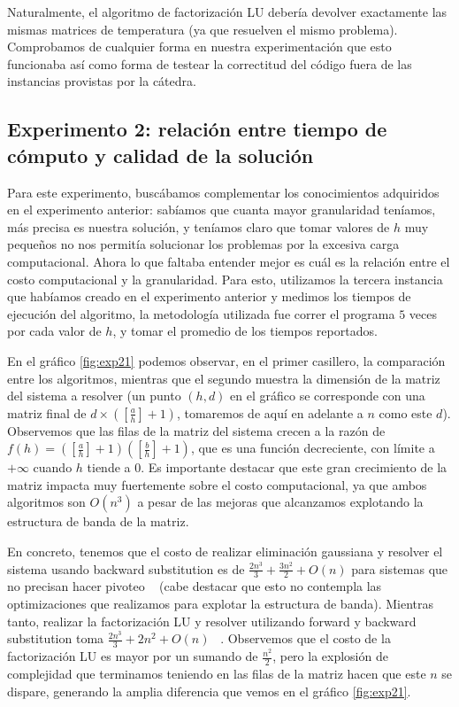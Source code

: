 Naturalmente, el algoritmo de factorización LU debería devolver exactamente las mismas matrices de temperatura (ya que resuelven el mismo problema). Comprobamos de cualquier forma en nuestra experimentación que esto funcionaba así como forma de testear la correctitud del código fuera de las instancias provistas por la cátedra.

\pagebreak

\subsection{Experimento 2: relación entre tiempo de cómputo y calidad de la solución}

Para este experimento, buscábamos complementar los conocimientos adquiridos en el experimento anterior: sabíamos que cuanta mayor granularidad teníamos, más precisa es nuestra solución, y teníamos claro que tomar valores de $h$ muy pequeños no nos permitía solucionar los problemas por la excesiva carga computacional. Ahora lo que faltaba entender mejor es cuál es la relación entre el costo computacional y la granularidad. Para esto, utilizamos la tercera instancia que habíamos creado en el experimento anterior y medimos los tiempos de ejecución del algoritmo, la metodología utilizada fue correr el programa $5$ veces por cada valor de $h$, y tomar el promedio de los tiempos reportados.

En el gráfico \ref{fig:exp21} podemos observar, en el primer casillero, la comparación entre los algoritmos, mientras que el segundo muestra la dimensión de la matriz del sistema a resolver (un punto $(h, d)$ en el gráfico se corresponde con una matriz final de $d \times ([\frac{a}{h}] + 1)$, tomaremos de aquí en adelante a $n$ como este $d$). Observemos que las filas de la matriz del sistema crecen a la razón de $f(h) = ([\frac{a}{h}] + 1)([\frac{b}{h}] + 1)$, que es una función decreciente, con límite a $+\infty$ cuando $h$ tiende a $0$. Es importante destacar que este gran crecimiento de la matriz impacta muy fuertemente sobre el costo computacional, ya que ambos algoritmos son $O(n^3)$ a pesar de las mejoras que alcanzamos explotando la estructura de banda de la matriz.

En concreto, tenemos que el costo de realizar eliminación gaussiana y resolver el sistema usando backward substitution es de $\frac{2n^3}{3} + \frac{3n^2}{2} + O(n)$ para sistemas que no precisan hacer pivoteo ~\cite{burden} (cabe destacar que esto no contempla las optimizaciones que realizamos para explotar la estructura de banda). Mientras tanto, realizar la factorización LU y resolver utilizando forward y backward substitution toma $\frac{2n^3}{3} + 2n^2 + O(n)$ ~\cite{LUComplexity}. Observemos que el costo de la factorización LU es mayor por un sumando de $\frac{n^2}{2}$, pero la explosión de complejidad que terminamos teniendo en las filas de la matriz hacen que este $n$ se dispare, generando la amplia diferencia que vemos en el gráfico \ref{fig:exp21}.


